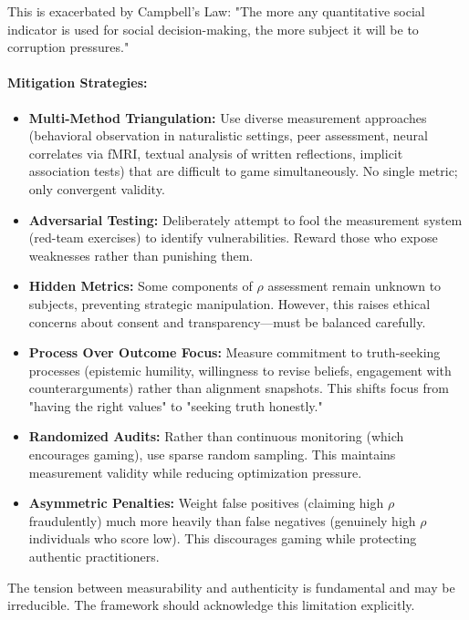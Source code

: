 \documentclass[11pt,a4paper]{article}
\theoremstyle{definition}
\theoremstyle{remark}
\begin{document}
\begin{small}
This is exacerbated by Campbell's Law: "The more any quantitative social indicator is used for social decision-making, the more subject it will be to corruption pressures."

\paragraph{Mitigation Strategies:}
\begin{itemize}
    \item \textbf{Multi-Method Triangulation:} Use diverse measurement approaches (behavioral observation in naturalistic settings, peer assessment, neural correlates via fMRI, textual analysis of written reflections, implicit association tests) that are difficult to game simultaneously. No single metric; only convergent validity.
    
    \item \textbf{Adversarial Testing:} Deliberately attempt to fool the measurement system (red-team exercises) to identify vulnerabilities. Reward those who expose weaknesses rather than punishing them.
    
    \item \textbf{Hidden Metrics:} Some components of \(\rho\) assessment remain unknown to subjects, preventing strategic manipulation. However, this raises ethical concerns about consent and transparency—must be balanced carefully.
    
    \item \textbf{Process Over Outcome Focus:} Measure commitment to truth-seeking processes (epistemic humility, willingness to revise beliefs, engagement with counterarguments) rather than alignment snapshots. This shifts focus from "having the right values" to "seeking truth honestly."
    
    \item \textbf{Randomized Audits:} Rather than continuous monitoring (which encourages gaming), use sparse random sampling. This maintains measurement validity while reducing optimization pressure.
    
    \item \textbf{Asymmetric Penalties:} Weight false positives (claiming high \(\rho\) fraudulently) much more heavily than false negatives (genuinely high \(\rho\) individuals who score low). This discourages gaming while protecting authentic practitioners.
\end{itemize}

The tension between measurability and authenticity is fundamental and may be irreducible. The framework should acknowledge this limitation explicitly.


\end{small}
\end{document}
